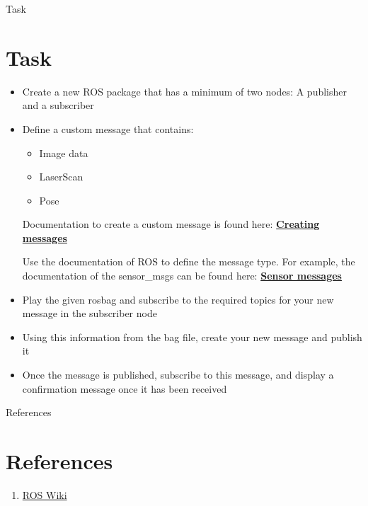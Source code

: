 \documentclass{beamer}
\begin{document}
\begin{frame}{Task}
	\section{Task}
	\begin{itemize}
		\item Create a new ROS package that has a minimum of two nodes: A publisher and a subscriber
		\item Define a custom message that contains:
		\begin{itemize}
			\item Image data
			\item LaserScan
			\item Pose 
		\end{itemize}
		Documentation to create a custom message is found here: 
	    \textbf{\href{http://wiki.ros.org/ROS/Tutorials/CreatingMsgAndSrv}{Creating messages}}
	    
		Use the documentation of ROS to define the message type. For example, the documentation of the sensor\_msgs can be found here: \textbf{\href{http://docs.ros.org/api/sensor_msgs/html/index-msg.html}{Sensor messages}}
		\item Play the given rosbag and subscribe to the required topics for your new message in the subscriber node
		\item Using this information from the bag file, create your new message and publish it
		\item Once the message is published, subscribe to this message, and display a confirmation message once it has been received
	\end{itemize}
\end{frame}

\begin{frame}{References}
	\section{References}
	\begin{enumerate}
		\item {\href{http://wiki.ros.org/custom/images/wiki/ROS_basic_concepts.png}{ROS Wiki}}
	\end{enumerate}
\end{frame}
\end{document}
